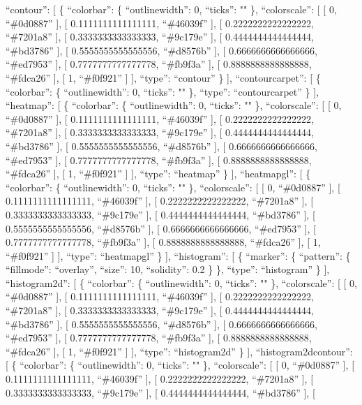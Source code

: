 \documentclass[
]{article}
\begin{document}
``contour'': {[} \{ ``colorbar'': \{ ``outlinewidth'': 0, ``ticks'': ""
\}, ``colorscale'': {[} {[} 0, ``\#0d0887'' {]}, {[} 0.1111111111111111,
``\#46039f'' {]}, {[} 0.2222222222222222, ``\#7201a8'' {]}, {[}
0.3333333333333333, ``\#9c179e'' {]}, {[} 0.4444444444444444,
``\#bd3786'' {]}, {[} 0.5555555555555556, ``\#d8576b'' {]}, {[}
0.6666666666666666, ``\#ed7953'' {]}, {[} 0.7777777777777778,
``\#fb9f3a'' {]}, {[} 0.8888888888888888, ``\#fdca26'' {]}, {[} 1,
``\#f0f921'' {]} {]}, ``type'': ``contour'' \} {]}, ``contourcarpet'':
{[} \{ ``colorbar'': \{ ``outlinewidth'': 0, ``ticks'': "" \}, ``type'':
``contourcarpet'' \} {]}, ``heatmap'': {[} \{ ``colorbar'': \{
``outlinewidth'': 0, ``ticks'': "" \}, ``colorscale'': {[} {[} 0,
``\#0d0887'' {]}, {[} 0.1111111111111111, ``\#46039f'' {]}, {[}
0.2222222222222222, ``\#7201a8'' {]}, {[} 0.3333333333333333,
``\#9c179e'' {]}, {[} 0.4444444444444444, ``\#bd3786'' {]}, {[}
0.5555555555555556, ``\#d8576b'' {]}, {[} 0.6666666666666666,
``\#ed7953'' {]}, {[} 0.7777777777777778, ``\#fb9f3a'' {]}, {[}
0.8888888888888888, ``\#fdca26'' {]}, {[} 1, ``\#f0f921'' {]} {]},
``type'': ``heatmap'' \} {]}, ``heatmapgl'': {[} \{ ``colorbar'': \{
``outlinewidth'': 0, ``ticks'': "" \}, ``colorscale'': {[} {[} 0,
``\#0d0887'' {]}, {[} 0.1111111111111111, ``\#46039f'' {]}, {[}
0.2222222222222222, ``\#7201a8'' {]}, {[} 0.3333333333333333,
``\#9c179e'' {]}, {[} 0.4444444444444444, ``\#bd3786'' {]}, {[}
0.5555555555555556, ``\#d8576b'' {]}, {[} 0.6666666666666666,
``\#ed7953'' {]}, {[} 0.7777777777777778, ``\#fb9f3a'' {]}, {[}
0.8888888888888888, ``\#fdca26'' {]}, {[} 1, ``\#f0f921'' {]} {]},
``type'': ``heatmapgl'' \} {]}, ``histogram'': {[} \{ ``marker'': \{
``pattern'': \{ ``fillmode'': ``overlay'', ``size'': 10, ``solidity'':
0.2 \} \}, ``type'': ``histogram'' \} {]}, ``histogram2d'': {[} \{
``colorbar'': \{ ``outlinewidth'': 0, ``ticks'': "" \}, ``colorscale'':
{[} {[} 0, ``\#0d0887'' {]}, {[} 0.1111111111111111, ``\#46039f'' {]},
{[} 0.2222222222222222, ``\#7201a8'' {]}, {[} 0.3333333333333333,
``\#9c179e'' {]}, {[} 0.4444444444444444, ``\#bd3786'' {]}, {[}
0.5555555555555556, ``\#d8576b'' {]}, {[} 0.6666666666666666,
``\#ed7953'' {]}, {[} 0.7777777777777778, ``\#fb9f3a'' {]}, {[}
0.8888888888888888, ``\#fdca26'' {]}, {[} 1, ``\#f0f921'' {]} {]},
``type'': ``histogram2d'' \} {]}, ``histogram2dcontour'': {[} \{
``colorbar'': \{ ``outlinewidth'': 0, ``ticks'': "" \}, ``colorscale'':
{[} {[} 0, ``\#0d0887'' {]}, {[} 0.1111111111111111, ``\#46039f'' {]},
{[} 0.2222222222222222, ``\#7201a8'' {]}, {[} 0.3333333333333333,
``\#9c179e'' {]}, {[} 0.4444444444444444, ``\#bd3786'' {]}, {[}
\end{document}
